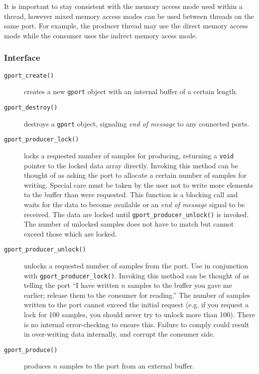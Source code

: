 It is important to stay consistent with the memory access mode used within a
thread, however mixed memory access modes can be used between threads on the
same port.
For example, the producer thread may use the direct memory access mode while
the consumer uses the indrect memory acess mode.

\subsubsection{Interface}
\label{module:buffer:gport:interface}

\begin{description}
\item[{\tt gport\_create()}]
    creates a new {\tt gport} object with an internal buffer of a certain
    length.
\item[{\tt gport\_destroy()}]
    destroys a {\tt gport} object, signaling {\it end of message} to any
    connected ports.
\item[{\tt gport\_producer\_lock()}]
    locks a requested number of samples for producing, returning a {\tt void}
    pointer to the locked data array directly.
    Invoking this method can be thought of as asking the port to allocate a
    certain number of samples for writing.
    Special care must be taken by the user not to write more elements to the
    buffer than were requested.
    This function is a blocking call and waits for the data to become
    available or an {\it end of message} signal to be received.
    The data are locked until {\tt gport\_producer\_unlock()} is invoked.
    The number of unlocked samples does not have to match but cannot exceed
    those which are locked.
\item[{\tt gport\_producer\_unlock()}]
    unlocks a requested number of samples from the port.
    Use in conjunction with {\tt gport\_producer\_lock()}.
    Invoking this method can be thought of as telling the port ``I have
    written $n$ samples to the buffer you gave me earlier; release them to the
    consumer for reading.''
    The number of samples written to the port cannot exceed the initial
    request (e.g. if you request a lock for 100 samples, you should never try
    to unlock more than 100).
    There is no internal error-checking to ensure this.
    Failure to comply could result in over-writing data internally, and
    corrupt the consumer side.
\item[{\tt gport\_produce()}]
    produces $n$ samples to the port from an external buffer.

\end{description}

